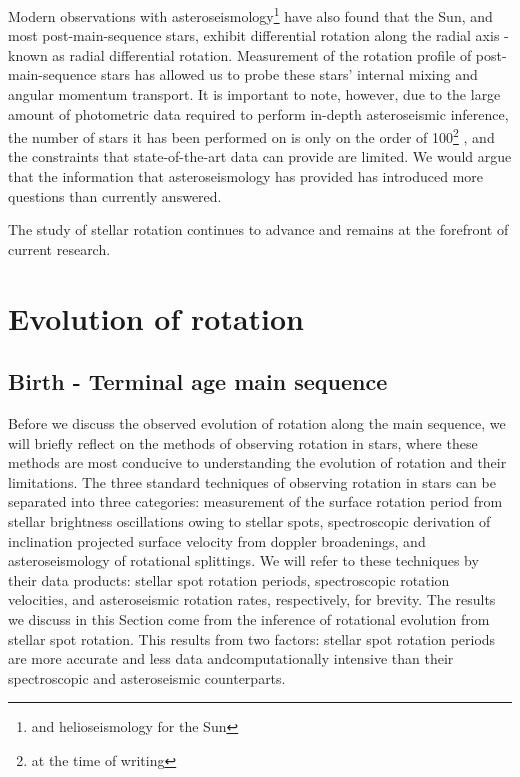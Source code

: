 Modern observations with asteroseismology\footnote{and helioseismology for the Sun} have also found that the Sun, and most post-main-sequence stars, exhibit differential rotation along the radial axis - known as radial differential rotation.
Measurement of the rotation profile of post-main-sequence stars has allowed us to probe these stars' internal mixing and angular momentum transport. 
It is important to note, however, due to the large amount of photometric data required to perform in-depth asteroseismic inference, the number of stars it has been performed on is only on the order of 100\footnote{at the time of writing} \citep{li_asteroseismology_2020,li_asteroseismology_2020-1}, and the constraints that state-of-the-art data can provide are limited. We would argue that the information that asteroseismology has provided has introduced more questions than currently answered.

The study of stellar rotation continues to advance and remains at the forefront of current research.

\section{Evolution of rotation}
\label{sec:evolution}

\subsection{Birth - Terminal age main sequence}

Before we discuss the observed evolution of rotation along the main sequence, we will briefly reflect on the methods of observing rotation in stars, where these methods are most conducive to understanding the evolution of rotation and their limitations.
The three standard techniques of observing rotation in stars can be separated into three categories: measurement of the surface rotation period from stellar brightness oscillations owing to stellar spots, spectroscopic derivation of inclination projected surface velocity from doppler broadenings, and asteroseismology of rotational splittings.
We will refer to these techniques by their data products: stellar spot rotation periods, spectroscopic rotation velocities, and asteroseismic rotation rates, respectively, for brevity.
The results we discuss in this Section come from the inference of rotational evolution from stellar spot rotation.
This results from two factors: stellar spot rotation periods are more accurate and less data andcomputationally intensive than their spectroscopic and asteroseismic counterparts.

